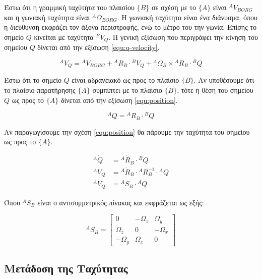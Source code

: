 Έστω ότι η γραμμική ταχύτητα του πλαισίου $\{Β\}$ σε σχέση με το $\{Α\}$ είναι $^AV_{BORG}$ και η γωνιακή ταχύτητα είναι $^A\Omega_{BORG}$. Η γωνιακή ταχύτητα είναι ένα διάνυσμα, όπου η διεύθυνση εκφράζει τον άξονα περιστροφής, ενώ το μέτρο του την γωνία. Επίσης το σημείο $Q$ κινείται με ταχύτητα $^BV_Q$. Η γενική εξίσωση που περιγράφει την κίνηση του σημείου $Q$ δίνεται από την εξίσωση \ref{equ:q-velocity}.

\begin{equation}
    ^AV_Q = {}^AV_{BORG} + {}^AR_B \cdot {}^BV_Q + {}^A\Omega_B \times {}^AR_B
    \cdot {}^BQ
    \label{equ:q-velocity}
\end{equation}

Έστω ότι το σημείο $Q$ είναι αδρανειακό ως προς το πλαίσιο $\{Β\}$. Αν υποθέσουμε ότι το πλαίσιο παρατήρησης $\{Α\}$ συμπίπτει με το πλαίσιο $\{Β\}$, τότε η θέση του σημείου $Q$ ως προς το $\{Α\}$ δίνεται από την εξίσωση \ref{equ:position}.

\begin{equation}
    ^AQ = {}^AR_B \cdot {}^BQ
    \label{equ:position}
\end{equation}

Αν παραγωγίσουμε την σχέση \ref{equ:position} θα πάρουμε την ταχύτητα του σημείου ως προς το $\{Α\}$.

\begin{equation}
    \begin{split}
        ^A\dot{Q} & = {}^A\dot{R}_B \cdot {}^BQ\\
        ^AV_Q & = {}^A\dot{R}_B \cdot {}^AR^{-1}_B \cdot {}^AQ\\
        ^AV_Q & = {}^AS_B \cdot {}^AQ
    \end{split}
    \label{equ:velocity}
\end{equation}

Όπου $^AS_B$ είναι ο αντισυμμετρικός πίνακας και εκφράζεται ως εξής:

\begin{equation}
    ^AS_B  =
    \begin{bmatrix}
        0 & -\Omega_z & \Omega_y\\
        \Omega_z & 0 & -\Omega_x\\
        -\Omega_y & \Omega_x & 0
    \end{bmatrix}
    \label{equ:skew-symmetric}
\end{equation}

\subsection{Μετάδοση της Ταχύτητας}


